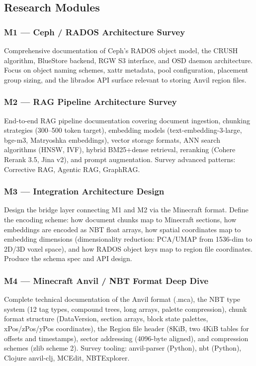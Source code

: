 \documentclass[11pt,letterpaper]{article}
\begin{document}
\subsection{Research Modules}

\subsubsection{M1 --- Ceph / RADOS Architecture Survey}
Comprehensive documentation of Ceph's RADOS object model, the CRUSH algorithm, BlueStore backend, RGW S3 interface, and OSD daemon architecture. Focus on object naming schemes, xattr metadata, pool configuration, placement group sizing, and the librados API surface relevant to storing Anvil region files.

\subsubsection{M2 --- RAG Pipeline Architecture Survey}
End-to-end RAG pipeline documentation covering document ingestion, chunking strategies (300--500 token target), embedding models (text-embedding-3-large, bge-m3, Matryoshka embeddings), vector storage formats, ANN search algorithms (HNSW, IVF), hybrid BM25+dense retrieval, reranking (Cohere Rerank 3.5, Jina v2), and prompt augmentation. Survey advanced patterns: Corrective RAG, Agentic RAG, GraphRAG.

\subsubsection{M3 --- Integration Architecture Design}
Design the bridge layer connecting M1 and M2 via the Minecraft format. Define the encoding scheme: how document chunks map to Minecraft sections, how embeddings are encoded as NBT float arrays, how spatial coordinates map to embedding dimensions (dimensionality reduction: PCA/UMAP from 1536-dim to 2D/3D voxel space), and how RADOS object keys map to region file coordinates. Produce the schema spec and API design.

\subsubsection{M4 --- Minecraft Anvil / NBT Format Deep Dive}
Complete technical documentation of the Anvil format (.mca), the NBT type system (12 tag types, compound trees, long arrays, palette compression), chunk format structure (DataVersion, section arrays, block state palettes, xPos/zPos/yPos coordinates), the Region file header (8KiB, two 4KiB tables for offsets and timestamps), sector addressing (4096-byte aligned), and compression schemes (zlib scheme 2). Survey tooling: anvil-parser (Python), nbt (Python), Clojure anvil-clj, MCEdit, NBTExplorer.
\end{document}
